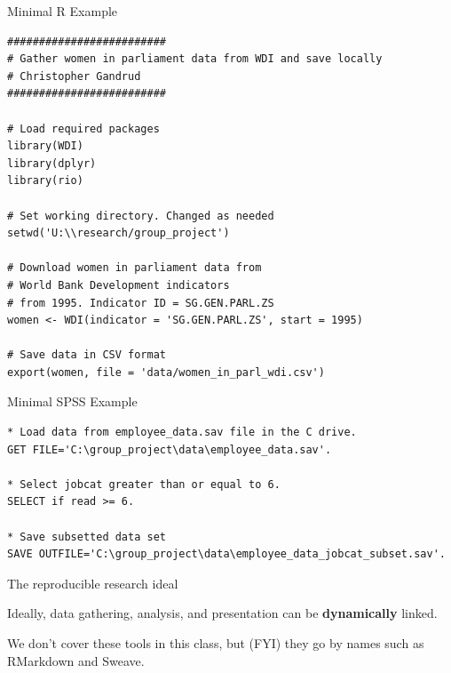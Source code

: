 \documentclass[10pt]{beamer}
\begin{document}
\begin{frame}[fragile]{Minimal R Example}

\begin{lstlisting}
#########################
# Gather women in parliament data from WDI and save locally
# Christopher Gandrud
#########################

# Load required packages
library(WDI)
library(dplyr)
library(rio)

# Set working directory. Changed as needed
setwd('U:\\research/group_project')

# Download women in parliament data from
# World Bank Development indicators
# from 1995. Indicator ID = SG.GEN.PARL.ZS
women <- WDI(indicator = 'SG.GEN.PARL.ZS', start = 1995)

# Save data in CSV format
export(women, file = 'data/women_in_parl_wdi.csv')
\end{lstlisting}

\end{frame}

\begin{frame}[fragile]{Minimal SPSS Example}

\begin{lstlisting}
* Load data from employee_data.sav file in the C drive.
GET FILE='C:\group_project\data\employee_data.sav'.

* Select jobcat greater than or equal to 6.
SELECT if read >= 6.

* Save subsetted data set
SAVE OUTFILE='C:\group_project\data\employee_data_jobcat_subset.sav'.
\end{lstlisting}

\end{frame}


\begin{frame}{The reproducible research ideal}

    Ideally, data gathering, analysis, and presentation can be \textbf{dynamically} linked.

    \vspace{1cm}

    We don't cover these tools in this class, but (FYI) they go by names such as RMarkdown and Sweave.

\end{frame}
\end{document}
